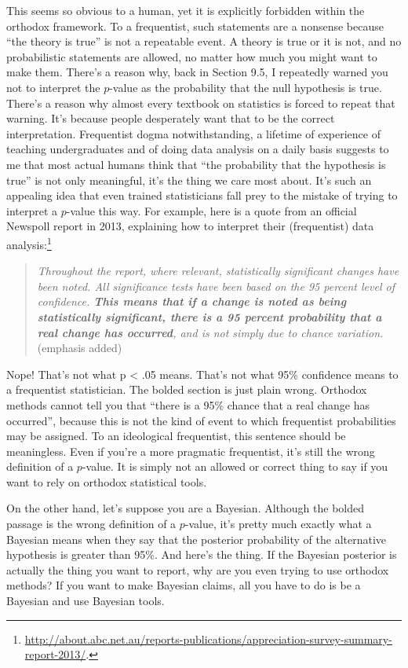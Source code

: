 \documentclass[
  a4paper,
]{book}
\begin{document}
This seems so obvious to a human, yet it is explicitly forbidden within
the orthodox framework. To a frequentist, such statements are a nonsense
because ``the theory is true'' is not a repeatable event. A theory is
true or it is not, and no probabilistic statements are allowed, no
matter how much you might want to make them. There's a reason why, back
in Section 9.5, I repeatedly warned you not to interpret the \(p\)-value
as the probability that the null hypothesis is true. There's a reason
why almost every textbook on statistics is forced to repeat that
warning. It's because people desperately want that to be the correct
interpretation. Frequentist dogma notwithstanding, a lifetime of
experience of teaching undergraduates and of doing data analysis on a
daily basis suggests to me that most actual humans think that ``the
probability that the hypothesis is true'' is not only meaningful, it's
the thing we care most about. It's such an appealing idea that even
trained statisticians fall prey to the mistake of trying to interpret a
\(p\)-value this way. For example, here is a quote from an official
Newspoll report in 2013, explaining how to interpret their (frequentist)
data analysis:\footnote{\url{http://about.abc.net.au/reports-publications/appreciation-survey-summary-report-2013/}.}

\begin{quote}
\emph{Throughout the report, where relevant, statistically significant
changes have been noted. All significance tests have been based on the
95 percent level of confidence. \textbf{This means that if a change is
noted as being statistically significant, there is a 95 percent
probability that a real change has occurred}, and is not simply due to
chance variation.} (emphasis added)
\end{quote}

Nope! That's not what p \textless{} .05 means. That's not what 95\%
confidence means to a frequentist statistician. The bolded section is
just plain wrong. Orthodox methods cannot tell you that ``there is a
95\% chance that a real change has occurred'', because this is not the
kind of event to which frequentist probabilities may be assigned. To an
ideological frequentist, this sentence should be meaningless. Even if
you're a more pragmatic frequentist, it's still the wrong definition of
a \(p\)-value. It is simply not an allowed or correct thing to say if
you want to rely on orthodox statistical tools.

On the other hand, let's suppose you are a Bayesian. Although the bolded
passage is the wrong definition of a \(p\)-value, it's pretty much
exactly what a Bayesian means when they say that the posterior
probability of the alternative hypothesis is greater than 95\%. And
here's the thing. If the Bayesian posterior is actually the thing you
want to report, why are you even trying to use orthodox methods? If you
want to make Bayesian claims, all you have to do is be a Bayesian and
use Bayesian tools.
\end{document}
